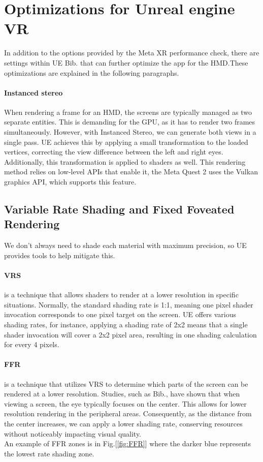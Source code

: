 \section{Optimizations for Unreal engine VR}
\noindent
In addition to the options provided by the Meta XR performance check, there are settings within \ac{UE} Bib.\cite{UEperformance} that can further optimize the app for the \ac{HMD}.These optimizations are explained in the following paragraphs.

\paragraph{Instanced stereo}
When rendering a frame for an \ac{HMD}, the screens are typically managed as two separate entities. This is demanding for the GPU, as it has to render two frames simultaneously.
However, with Instanced Stereo, we can generate both views in a single pass. \ac{UE} achieves this by applying a small transformation to the loaded vertices, correcting the view difference between the left and right eyes. Additionally, this transformation is applied to shaders as well.
This rendering method relies on low-level \ac{API}s that enable it, the Meta Quest 2 uses the Vulkan graphics \ac{API}, which supports this feature.

\subsection{Variable Rate Shading and Fixed Foveated Rendering}
\noindent
We don't always need to shade each material with maximum precision, so \ac{UE} provides tools to help mitigate this.

\paragraph{\ac{VRS}}
is a technique that allows shaders to render at a lower resolution in specific situations.
Normally, the standard shading rate is 1:1, meaning one pixel shader invocation corresponds to one pixel target on the screen.
\ac{UE} offers various shading rates, for instance, applying a shading rate of 2x2 means that a single shader invocation will cover a 2x2 pixel area, resulting in one shading calculation for every 4 pixels.

\paragraph{\ac{FFR}}
is a technique that utilizes \ac{VRS} to determine which parts of the screen can be rendered at a lower resolution.
Studies, such as Bib.\cite{eye}, have shown that when viewing a screen, the eye typically focuses on the center.
This allows for lower resolution rendering in the peripheral areas. Consequently, as the distance from the center increases, we can apply a lower shading rate, conserving resources without noticeably impacting visual quality.\\
An example of \ac{FFR} zones is in Fig.[\ref{fig:FFR}] where the darker blue represents the lowest rate shading zone.



